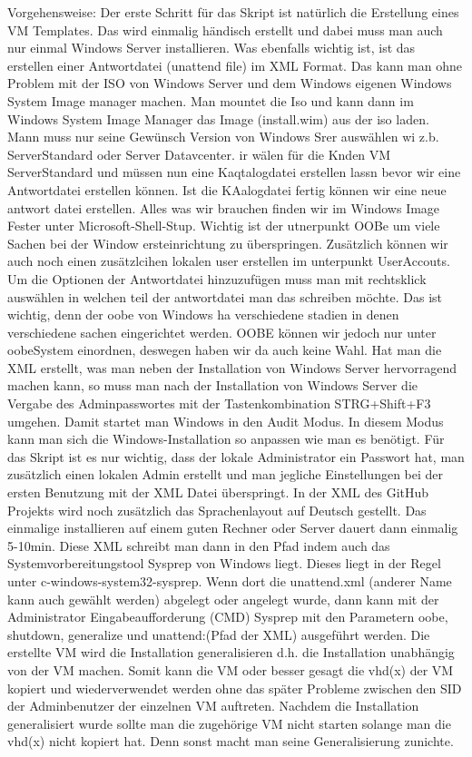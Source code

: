 \documentclass[conference]{IEEEtran}
\begin{document}
Vorgehensweise:
Der erste Schritt für das Skript ist natürlich die Erstellung eines VM Templates. Das wird einmalig händisch erstellt und dabei muss man auch nur einmal Windows Server installieren. Was ebenfalls wichtig ist, ist das erstellen einer Antwortdatei (unattend file) im XML Format. Das kann man ohne Problem mit der ISO von Windows Server und dem Windows eigenen Windows System Image manager machen. Man mountet die Iso und kann dann im Windows System Image Manager das Image (install.wim) aus der iso laden. Mann muss nur seine Gewünsch Version von Windows Srer auswählen wi z.b. ServerStandard oder Server Datavcenter. ir wälen für die Knden VM ServerStandard und müssen nun eine Kaqtalogdatei erstellen lassn bevor wir eine Antwortdatei erstellen können. Ist die KAalogdatei fertig können wir eine neue antwort datei erstellen.  Alles was wir brauchen finden wir im Windows Image Fester unter Microsoft-Shell-Stup. Wichtig ist der utnerpunkt OOBe um viele Sachen bei der Window ersteinrichtung zu überspringen. Zusätzlich können wir auch noch einen zusätzlcihen lokalen user erstellen im unterpunkt UserAccouts. Um die Optionen der Antwortdatei hinzuzufügen muss man mit rechtsklick auswählen in welchen teil der antwortdatei man das schreiben möchte. Das ist wichtig, denn der oobe von Windows ha verschiedene stadien in denen verschiedene sachen eingerichtet werden. OOBE können wir jedoch nur unter oobeSystem einordnen, deswegen haben wir da auch keine Wahl.
Hat man die XML erstellt, was man neben der Installation von Windows Server hervorragend machen kann, so muss man nach der Installation von Windows Server die Vergabe des Adminpasswortes mit der Tastenkombination STRG+Shift+F3 umgehen. Damit startet man Windows in den Audit Modus. In diesem Modus kann man sich die Windows-Installation so anpassen wie man es benötigt. Für das Skript ist es nur wichtig, dass der lokale Administrator ein Passwort hat, man zusätzlich einen lokalen Admin erstellt und man jegliche Einstellungen bei der ersten Benutzung mit der XML Datei überspringt. In der XML des GitHub Projekts wird noch zusätzlich das Sprachenlayout auf Deutsch gestellt. Das einmalige installieren auf einem guten Rechner oder Server dauert dann einmalig 5-10min.
Diese XML schreibt man dann in den Pfad indem auch das Systemvorbereitungstool Sysprep von Windows liegt. Dieses liegt in der Regel unter  c-windows-system32-sysprep. Wenn dort die unattend.xml (anderer Name kann auch gewählt werden) abgelegt oder angelegt wurde, dann kann mit der Administrator Eingabeaufforderung (CMD)  Sysprep mit den Parametern oobe, shutdown, generalize und unattend:(Pfad der XML) ausgeführt werden. Die erstellte VM wird die Installation generalisieren d.h. die Installation unabhängig von der VM machen. Somit kann die VM oder besser gesagt die vhd(x) der VM kopiert und wiederverwendet werden ohne das später Probleme zwischen den SID der Adminbenutzer der einzelnen VM auftreten. Nachdem die Installation generalisiert wurde sollte man die zugehörige VM nicht starten solange man die vhd(x) nicht kopiert hat. Denn sonst macht man seine Generalisierung zunichte.
\end{document}
